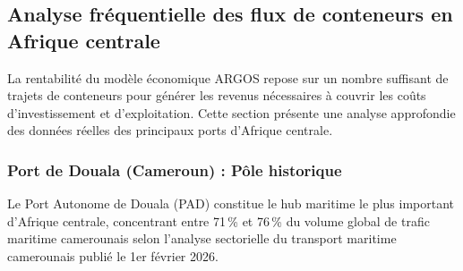 

\subsection{Analyse fréquentielle des flux de conteneurs en Afrique centrale}

La rentabilité du modèle économique ARGOS repose sur un nombre suffisant de trajets de conteneurs pour générer les revenus nécessaires à couvrir les coûts d’investissement et d’exploitation. Cette section présente une analyse approfondie des données réelles des principaux ports d’Afrique centrale.

\subsubsection{Port de Douala (Cameroun) : Pôle historique}
Le Port Autonome de Douala (PAD) constitue le hub maritime le plus important d’Afrique centrale, concentrant entre 71\,\% et 76\,\% du volume global de trafic maritime camerounais selon l’analyse sectorielle du transport maritime camerounais publié le 1er février 2026\cite{pad2025}.

